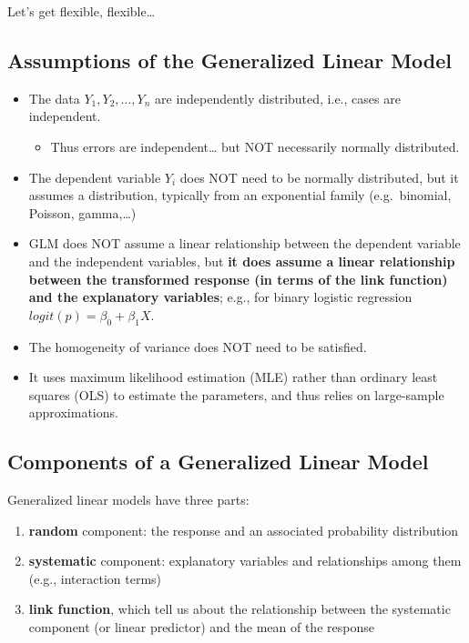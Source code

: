 \documentclass[
  openany]{book}
\providecommand{\tightlist}{%
  \setlength{\itemsep}{0pt}\setlength{\parskip}{0pt}}
\begin{document}
Let's get flexible, flexible\ldots{}

\hypertarget{assumptions-of-the-generalized-linear-model}{%
\subsection{Assumptions of the Generalized Linear Model}\label{assumptions-of-the-generalized-linear-model}}

\begin{itemize}
\item
  The data \(Y_1, Y_2, ..., Y_n\) are independently distributed, i.e.,
  cases are independent.

  \begin{itemize}
  \tightlist
  \item
    Thus errors are independent\ldots{} but NOT necessarily normally
    distributed.
  \end{itemize}
\item
  The dependent variable \(Y_i\) does NOT need to be normally
  distributed, but it assumes a distribution, typically from an
  exponential family (e.g.~binomial, Poisson, gamma,\ldots)
\item
  GLM does NOT assume a linear relationship between the dependent
  variable and the independent variables, but \textbf{it does assume a
  linear relationship between the transformed response (in terms of
  the link function) and the explanatory variables}; e.g., for binary
  logistic regression \(logit(p) = \beta_0 + \beta_1X\).
\item
  The homogeneity of variance does NOT need to be satisfied.
\item
  It uses maximum likelihood estimation (MLE) rather than ordinary
  least squares (OLS) to estimate the parameters, and thus relies on
  large-sample approximations.
\end{itemize}

\hypertarget{components-of-a-generalized-linear-model}{%
\subsection{Components of a Generalized Linear Model}\label{components-of-a-generalized-linear-model}}

Generalized linear models have three parts:

\begin{enumerate}
\def\labelenumi{\arabic{enumi}.}
\tightlist
\item
  \textbf{random} component: the response and an associated probability
  distribution\\
\item
  \textbf{systematic} component: explanatory variables and relationships
  among them (e.g., interaction terms)
\item
  \textbf{link function}, which tell us about the relationship between the
  systematic component (or linear predictor) and the mean of the
  response
\end{enumerate}
\end{document}

